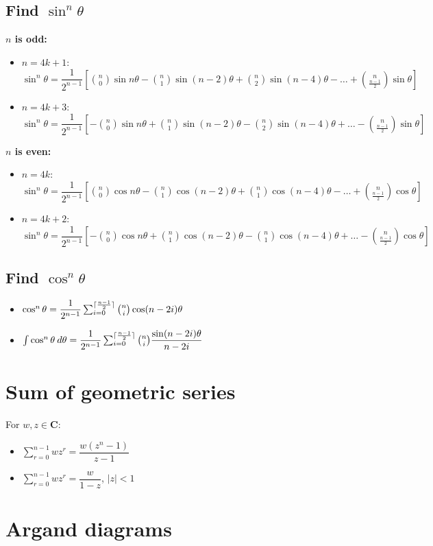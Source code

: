 \subsection{Find $\sin^n\theta$}
\textbf{$n$ is odd:}
\begin{itemize}
	\item $n=4k+1$: $\sin^n\theta=\dfrac{1}{2^{n-1}}[\binom{n}{0}\sin n\theta - \binom{n}{1}\sin (n-2)\theta + \binom{n}{2}\sin (n-4)\theta - \dots + \binom{n}{\frac{n-1}{2}}\sin \theta]$
	\item $n=4k+3$: $\sin^n\theta=\dfrac{1}{2^{n-1}}[-\binom{n}{0}\sin n\theta + \binom{n}{1}\sin (n-2)\theta - \binom{n}{2}\sin (n-4)\theta + \dots - \binom{n}{\frac{n-1}{2}}\sin \theta]$
\end{itemize}
\textbf{$n$ is even:}
\begin{itemize}
	\item $n=4k$: $\sin^n\theta=\dfrac{1}{2^{n-1}}[\binom{n}{0}\cos n\theta - \binom{n}{1}\cos (n-2)\theta + \binom{n}{1}\cos (n-4)\theta - \dots + \binom{n}{\frac{n-1}{2}}\cos \theta]$
	\item $n=4k+2$: $\sin^n\theta=\dfrac{1}{2^{n-1}}[-\binom{n}{0}\cos n\theta + \binom{n}{1}\cos (n-2)\theta - \binom{n}{1}\cos (n-4)\theta + \dots - \binom{n}{\frac{n-1}{2}}\cos \theta]$
\end{itemize}
\subsection{Find $\cos^n\theta$}
\begin{itemize}
	\item $\cos^n\theta = \dfrac{1}{2^{n-1}}\sum_{i=0}^{\lceil\frac{n-1}{2}\rceil} \binom{n}{i}\cos (n-2i)\theta$
	\item $\int \cos^n\theta \: d\theta = \dfrac{1}{2^{n-1}} \sum_{i=0}^{\lceil\frac{n-1}{2}\rceil} \binom{n}{i} \dfrac{\sin (n-2i)\theta}{n-2i}$
\end{itemize}

\section{Sum of geometric series}
For $w, z \in \textbf{C}$:
\begin{itemize}
	\item $\sum\limits_{r=0}^{n-1}wz^r=\dfrac{w(z^n-1)}{z-1}$
	\item $\sum\limits_{r=0}^{n-1}wz^r=\dfrac{w}{1-z}$, $|z|<1$
\end{itemize}

\section{Argand diagrams}
